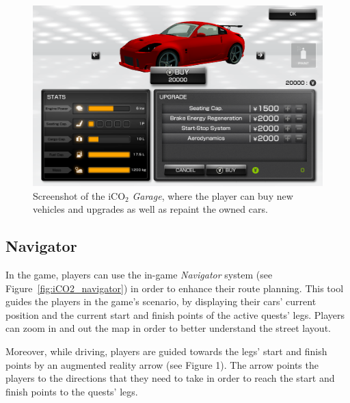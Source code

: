 \documentclass[preprint,authoryear,12pt]{elsarticle}
\begin{document}
\begin{figure}[htb]
\begin{center}
\includegraphics[width=.80\linewidth]{ijhcs14-img/iCO2_garage}
\caption{Screenshot of the iCO$_2$ \textit{Garage}, where the player can buy new vehicles and upgrades as well as repaint the owned cars.\label{fig:iCO2_garage}}
\end{center}
\end{figure}

\subsection{Navigator}

In the game, players can use the in-game \textit{Navigator} system (see Figure~\ref{fig:iCO2_navigator}) in order to enhance their route planning. This tool guides the players in the game's scenario, by displaying their cars' current position and the current start and finish points of the active quests' legs. Players can zoom in and out the map in order to better understand the street layout.

Moreover, while driving, players are guided towards the legs' start and finish points by an augmented reality arrow (see Figure 1). The arrow points the players to the directions that they need to take in order to reach the start and finish points to the quests' legs.
\end{document}
